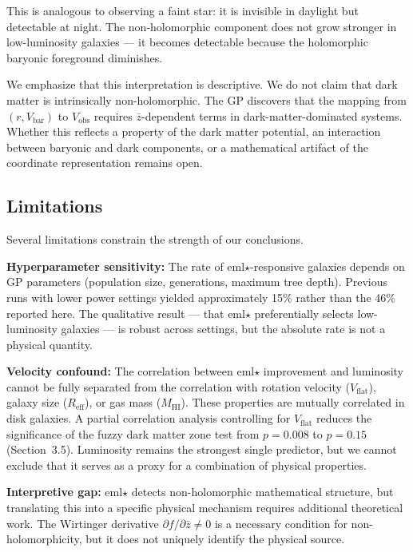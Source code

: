 \documentclass[12pt,a4paper]{article}
\begin{document}
This is analogous to observing a faint star: it is invisible in daylight but detectable at night. The non-holomorphic component does not grow stronger in low-luminosity galaxies --- it becomes detectable because the holomorphic baryonic foreground diminishes.

We emphasize that this interpretation is descriptive. We do not claim that dark matter is intrinsically non-holomorphic. The GP discovers that the mapping from $(r, V_\mathrm{bar})$ to $V_\mathrm{obs}$ requires $\bar{z}$-dependent terms in dark-matter-dominated systems. Whether this reflects a property of the dark matter potential, an interaction between baryonic and dark components, or a mathematical artifact of the coordinate representation remains open.

\subsection{Limitations}

Several limitations constrain the strength of our conclusions.

\textbf{Hyperparameter sensitivity:} The rate of eml$\star$-responsive galaxies depends on GP parameters (population size, generations, maximum tree depth). Previous runs with lower power settings yielded approximately 15\% rather than the 46\% reported here. The qualitative result --- that eml$\star$ preferentially selects low-luminosity galaxies --- is robust across settings, but the absolute rate is not a physical quantity.

\textbf{Velocity confound:} The correlation between eml$\star$ improvement and luminosity cannot be fully separated from the correlation with rotation velocity ($V_\mathrm{flat}$), galaxy size ($R_\mathrm{eff}$), or gas mass ($M_\mathrm{HI}$). These properties are mutually correlated in disk galaxies. A partial correlation analysis controlling for $V_\mathrm{flat}$ reduces the significance of the fuzzy dark matter zone test from $p = 0.008$ to $p = 0.15$ (Section~3.5). Luminosity remains the strongest single predictor, but we cannot exclude that it serves as a proxy for a combination of physical properties.

\textbf{Interpretive gap:} eml$\star$ detects non-holomorphic mathematical structure, but translating this into a specific physical mechanism requires additional theoretical work. The Wirtinger derivative $\partial f/\partial \bar{z} \neq 0$ is a necessary condition for non-holomorphicity, but it does not uniquely identify the physical source.
\end{document}
